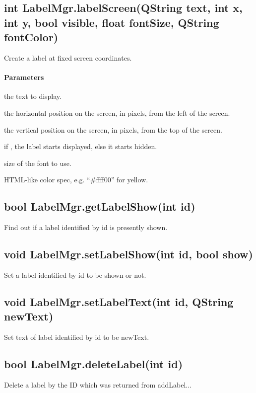 \subsection{int LabelMgr.labelScreen(QString text, int x, int y, bool visible, float fontSize, QString fontColor)}
\label{sec:ScriptingAPI:LabelMgr:labelScreen}
Create a label at fixed screen coordinates.

\paragraph{Parameters}
\begin{description}[align=right,labelwidth=3cm,leftmargin=3.2cm]
\item[\parameter{text}] the text to display.
\item[\parameter{x}] the horizontal position on the screen, in pixels, from the left of the screen.
\item[\parameter{y}] the vertical position on the screen, in pixels, from the top of the screen.
\item[\parameter{visible}] if , the label starts displayed, else it starts hidden.
\item[\parameter{fontSize}] size of the font to use.
\item[\parameter{fontColor}] HTML-like color spec, e.g. ``\#ffff00'' for yellow.
\end{description}

\subsection{bool LabelMgr.getLabelShow(int id)}
\label{sec:ScriptingAPI:LabelMgr:getLabelShow}
Find out if a label identified by id is presently shown.

\subsection{void LabelMgr.setLabelShow(int id, bool show)}
\label{sec:ScriptingAPI:LabelMgr:setLabelShow}
Set a label identified by id to be shown or not.

\subsection{void LabelMgr.setLabelText(int id, QString newText)}
\label{sec:ScriptingAPI:LabelMgr:setLabelText}
Set text of label identified by id to be newText.

\subsection{bool LabelMgr.deleteLabel(int id)}
\label{sec:ScriptingAPI:LabelMgr:deleteLabel}
Delete a label by the ID which was returned from addLabel...

